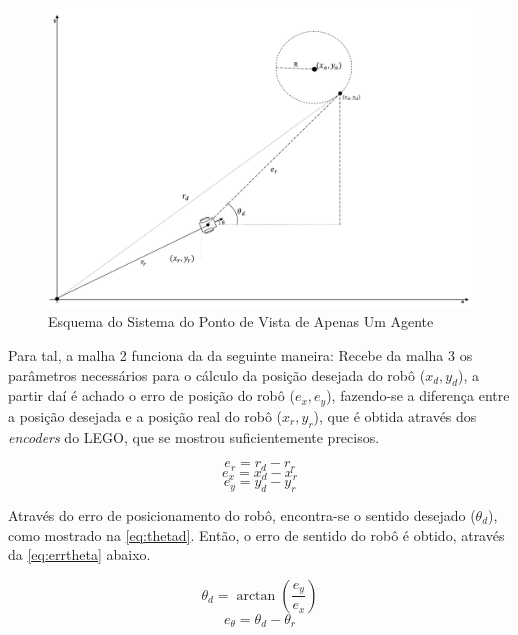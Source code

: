 \begin{figure}[!htb]
	\centering
	\includegraphics[width=1.0\textwidth]{./04-figuras/esqSistema}
	\caption{Esquema do Sistema do Ponto de Vista de Apenas Um Agente}
	\label{fig:esq2}
\end{figure}

Para tal, a malha 2 funciona da da seguinte maneira: Recebe da malha 3 os parâmetros necessários para o cálculo da posição desejada do robô (\emph{$x_{d},y_{d}$}), a partir daí é achado o erro de posição do robô (\emph{$e_{x},e_{y}$}), fazendo-se a diferença entre a posição desejada e a posição real do robô (\emph{$x_{r},y_{r}$}), que é obtida através dos \emph{encoders} do LEGO\textregistered, que se mostrou suficientemente precisos.

\begin{equation}
e_{r} = r_{d} - r_{r}
\label{eq:errr}
\end{equation}
\begin{equation}
e_{x} = x_{d} - x_{r}
\label{eq:errx}
\end{equation}
\begin{equation}
e_{y} = y_{d} - y_{r}
\label{eq:erry}
\end{equation}

Através do erro de posicionamento do robô, encontra-se o sentido desejado (\emph{$\theta_{d}$}), como mostrado na \autoref{eq:thetad}. Então, o erro de sentido do robô é obtido, através da \autoref{eq:errtheta} abaixo. 

\begin{equation}
\theta_{d} = \arctan(\dfrac{e_{y}}{e_{x}})
\label{eq:thetad}
\end{equation}
\begin{equation}
e_{\theta} = \theta_{d} - \theta_{r}
\label{eq:errtheta}
\end{equation}

